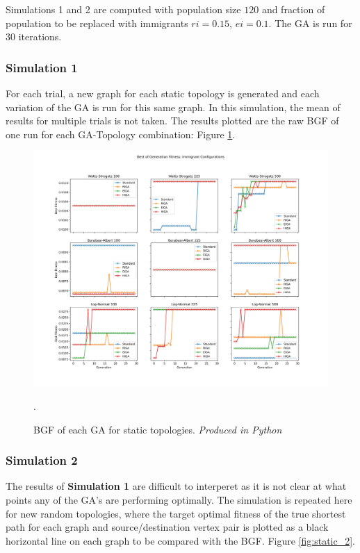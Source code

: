 \documentclass[
	a4paper, %
	10pt, %
	unnumberedsections, %
	twoside, %
]{LTJournalArticle}
\begin{document}
Simulations 1 and 2 are computed with population size \(120\) and fraction of population to be replaced with immigrants \(ri = 0.15\), \(ei = 0.1\). The GA is run for \(30\) iterations. \\

\subsubsection{Simulation 1} For each trial, a new graph for each static topology is generated and each variation of the GA is run for this same graph. In this simulation, the mean of results for multiple trials is not taken. The results plotted are the raw BGF of one run for each GA-Topology combination: Figure \ref{fig:static_1}.

\begin{figure}
	\includegraphics[width=\linewidth]{Figures/sims/static/experiment_1.jpg}
	\caption{BGF of each GA for static topologies.  \emph{Produced in Python}}. 
	\label{fig:static_1}
\end{figure}

\subsubsection{Simulation 2} The results of \textbf{Simulation 1} are difficult to interperet as it is not clear at what points any of the GA's are performing optimally. The simulation is repeated here for new random topologies, where the target optimal fitness of the true shortest path for each graph and source/destination vertex pair is plotted as a black horizontal line on each graph to be compared with the BGF. Figure \ref{fig:static_2}. 
\end{document}
